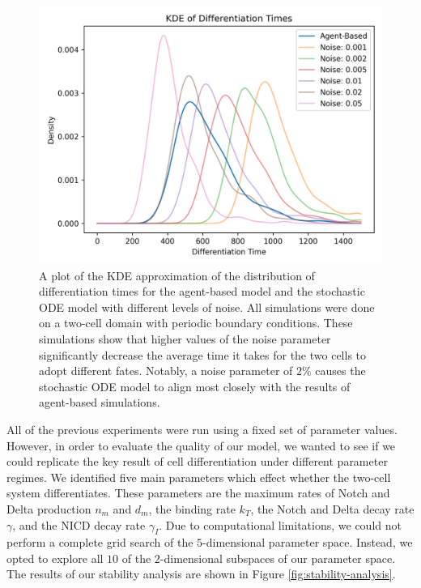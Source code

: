 \documentclass{article}
\begin{document}
\begin{figure}[!htp]
  \includegraphics[width=\textwidth]{img/vis11_V2.png}
  \caption{A plot of the KDE approximation of the distribution of differentiation times for the agent-based model and the stochastic ODE model with different levels of noise. All simulations were done on a two-cell domain with periodic boundary conditions. These simulations show that higher values of the noise parameter significantly decrease the average time it takes for the two cells to adopt different fates. Notably, a noise parameter of $2\%$ causes the stochastic ODE model to align most closely with the results of agent-based simulations. }
  \label{fig:noise-estimate}
\end{figure}

All of the previous experiments were run using a fixed set of parameter values.
However, in order to evaluate the quality of our model, we wanted to see if we could replicate the key result of cell differentiation under different parameter regimes.
We identified five main parameters which effect whether the two-cell system differentiates.
These parameters are the maximum rates of Notch and Delta production $n_{m}$ and $d_{m}$, the binding rate $k_{T}$, the Notch and Delta decay rate $\gamma$, and the NICD decay rate $\gamma_{I}$.
Due to computational limitations, we could not perform a complete grid search of the $5$-dimensional parameter space.
Instead, we opted to explore all $10$ of the $2$-dimensional subspaces of our parameter space.
The results of our stability analysis are shown in Figure \ref{fig:stability-analysis}.
\end{document}
